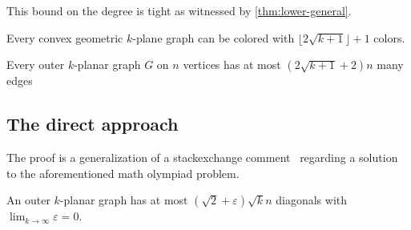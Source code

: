 \documentclass[nolineno,a4paper,USenglish,cleveref,autoref,thm-restate]
{socg}
\begin{document}
This bound on the degree is tight as witnessed by \cref{thm:lower-general}.
\begin{corollary}
    Every convex geometric $k$-plane graph can be colored with $\lfloor2\sqrt{k+1}\rfloor+1$ colors.
\end{corollary}

\begin{corollary}
Every outer $k$-planar graph $G$ on $n$ vertices has at most $(2\sqrt{k+1}+2)n$ many edges 
\end{corollary}

\subsection{The direct approach}
The proof is a generalization of a stackexchange comment~\cite{4767941} regarding a solution to the aforementioned math olympiad problem.
\begin{theorem} \label{thm:upper-new}
An outer $k$-planar graph has at most $(\sqrt{2}+\varepsilon)\sqrt{k}n$ diagonals with 
$\lim_{k\to \infty} \varepsilon= 0$.
\end{theorem}
\end{document}
